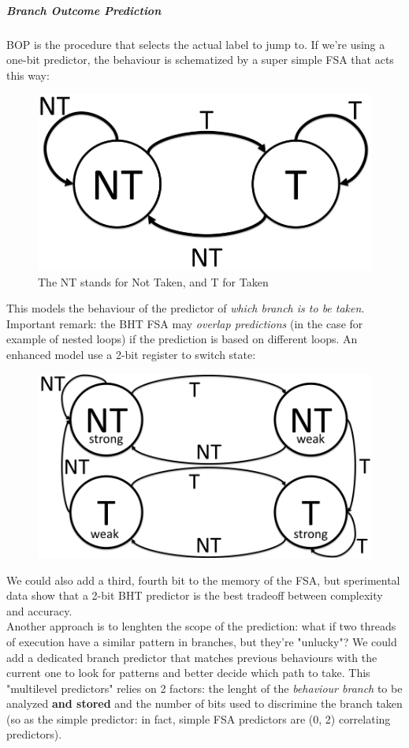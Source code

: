 \documentclass[10pt,a4paper]{article}
\begin{document}
						\subparagraph{Branch Outcome Prediction}
							BOP is the procedure that selects the actual label to jump to. If we're using a one-bit predictor, the behaviour is schematized by a super simple FSA that acts this way:
							\begin{figure}[H]
								\centering
								\includegraphics[width = \textwidth]{./images/BHTFSA.png}
								\caption{The NT stands for Not Taken, and T for Taken}
							\end{figure}
							This models the behaviour of the predictor of \emph{which branch is to be taken}.\\
							Important remark: the BHT FSA may \emph{overlap predictions} (in the case for example of nested loops) if the prediction is based on different loops. An enhanced model use a 2-bit register to switch state:
							\begin{figure}[H]
								\centering
								\includegraphics[width = \textwidth]{./images/BHTFSA2.png}
							\end{figure}
							We could also add a third, fourth bit to the memory of the FSA, but sperimental data show that a 2-bit BHT predictor is the best tradeoff between complexity and accuracy.\\
							Another approach is to lenghten the scope of the prediction: what if two threads of execution have a similar pattern in branches, but they're "unlucky"? We could add a dedicated branch predictor that matches previous behaviours with the current one to look for patterns and better decide which path to take. This "multilevel predictors" relies on 2 factors: the lenght of the \emph{behaviour branch} to be analyzed \textbf{and stored} and the number of bits used to discrimine the branch taken (so as the simple predictor: in fact, simple FSA predictors are (0, 2) correlating predictors).\\
							
\end{document}

